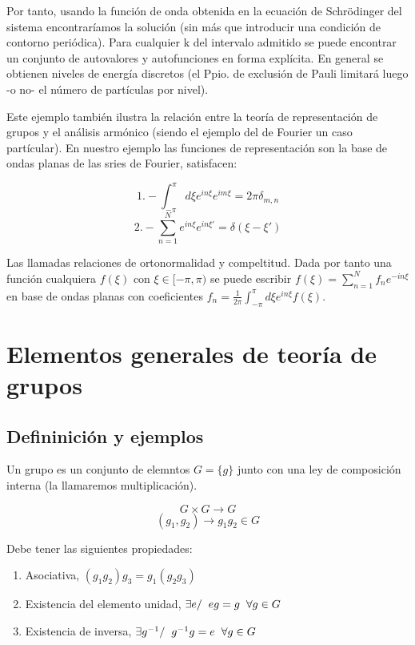 \documentclass{article}
\begin{document}
Por tanto, usando la función de onda obtenida en la ecuación de Schrödinger del sistema encontraríamos la solución (sin más que introducir una condición de contorno periódica). Para cualquier k del intervalo admitido se puede encontrar un conjunto de autovalores y autofunciones en forma explícita. En general se obtienen niveles de energía discretos (el Ppio. de exclusión de Pauli limitará luego -o no- el número de partículas por nivel).

\smallskip
Este ejemplo también ilustra la relación entre la teoría de representación de grupos y el análisis armónico (siendo el ejemplo del de Fourier un caso partícular). En nuestro ejemplo las funciones de representación son la base de ondas planas de las sries de Fourier, satisfacen:

$$1.- \int ^\pi _{-\pi} d\xi e^{in\xi} e^{im\xi} =2\pi \delta _{m,n}$$
$$2.- \sum _{n=1}^N e^{in\xi}e^{in\xi '}=\delta (\xi-\xi ')$$

Las llamadas relaciones de ortonormalidad y compeltitud. Dada por tanto una función cualquiera $f(\xi)$ con $\xi \in [-\pi,\pi)$ se puede escribir $f(\xi)=\sum _{n=1}^N f_ne^{-in\xi}$ en base de ondas planas con coeficientes $f_n=\frac{1}{2\pi}\int^\pi _{-\pi}d\xi e^{in\xi}f(\xi)$.






\newpage

\section{Elementos generales de teoría de grupos}
\subsection{Defininición y ejemplos}
Un grupo es un conjunto de elemntos $G=\lbrace g\rbrace$ junto con una ley de composición interna (la llamaremos multiplicación).

$$G\times G\rightarrow G$$
$$(g_1,g_2)\rightarrow g_1g_2 \in G$$

Debe tener las siguientes propiedades:

\begin{enumerate}
    \item Asociativa, $ (g_1g_2)g_3=g_1(g_2g_3)$
    \item Existencia del elemento unidad, $\exists e / \hspace{0.2cm} eg=g\hspace{0.2cm} \forall g\in G$
    \item Existencia de inversa, $\exists g^{-1} / \hspace{0.2cm} g^{-1}g=e \hspace{0.2cm} \forall g\in G$
\end{enumerate}
\end{document}
